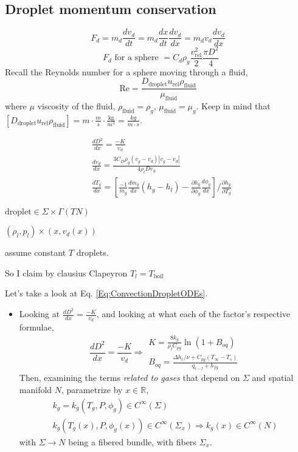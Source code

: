 \documentclass[10pt]{amsart}
\begin{document}
\begin{multicols*}{2}
\subsection{Droplet momentum conservation}


\[
F_d = m_d \frac{dv_d}{dt} = m_d \frac{dx}{dt} \frac{dv_d}{dx} = m_d v_d \frac{dv_d}{dx}
\]
\[
\text{ $F_d$ for a sphere } = C_d \rho_g \frac{v_{\text{rel}}^2}{2} \frac{ \pi D^2}{4}
\]
Recall the Reynolds number for a sphere moving through a fluid,
\[
\text{Re} = \frac{D_{\text{droplet}} u_{\text{rel}} \rho_{\text{fluid}}}{\mu_{\text{fluid}}}
\]
where $\mu $ viscosity of the fluid, $\rho_{\text{fluid}} = \rho_g$, $\mu_{\text{fluid}} = \mu_g$.  Keep in mind that $[D_{\text{droplet}} u_{\text{rel}} \rho_{\text{fluid}}] = m\cdot \frac{m}{s} \cdot \frac{\text{kg}}{m^3} = \frac{kg}{m\cdot s}$.


\begin{equation}\label{Eq:ConvectionDropletODEs}
  \begin{aligned}
    & \frac{dD^2}{dx} = \frac{-K}{v_d} \\ 
    &  \frac{dv_d}{dx} = \frac{3C_D \rho_g (v_g-v_d)|v_g-v_d| }{ 4\rho_l Dv_d} \\ 
    & \frac{dT_g}{dx} = \left[ \frac{-1}{\dot{m}_g} \frac{d\dot{m}_g}{dx} (h_g-h_l) - \frac{\partial h_g}{\partial \phi_g} \frac{ d\phi_g}{dx} \right]/ \frac{ \partial h_g}{\partial T_g}
  \end{aligned}
\end{equation}


$\text{droplet} \in \Sigma \times \Gamma(TN)$ 

$(\rho_l,p_l) \times (x,v_d(x))$

assume constant $T$ droplets. 

So I claim by clausius Clapeyron $T_l = T_{\text{boil}}$

Let's take a look at Eq. \ref{Eq:ConvectionDropletODEs}.  

\begin{itemize}
\item Looking at $\frac{dD^2}{dx} = \frac{-K}{v_d}$, and looking at what each of the factor's respective formulae,
\[
\frac{dD^2}{dx} = \frac{-K}{v_d} \Longrightarrow \begin{gathered}
  K = \frac{ 8 k_g}{\rho_l C_{pg}} \ln{ (1+B_{oq})} \\
  B_{oq} = \frac{ \Delta h_c/\nu  + C_{pg}(T_{\infty}-T_s)  }{ q_{i-l} + h_{fg} }
\end{gathered}
\]
Then, examining the terms \emph{related to gases} that depend on $\Sigma$ and spatial manifold $N$, parametrize by $x\in \mathbb{R}$, 
\[
\begin{gathered}
  k_g = k_g(T_g,P,\phi_g) \in C^{\infty}(\Sigma) \\
  k_g(T_g(x), P, \phi_g(x)) \in C^{\infty}(\Sigma_x) \Longrightarrow k_g(x) \in C^{\infty}(N)
\end{gathered}
\]
with $\Sigma \to N$ being a fibered bundle, with fibers $\Sigma_x$.  


\end{itemize}
\end{multicols*}
\end{document}
